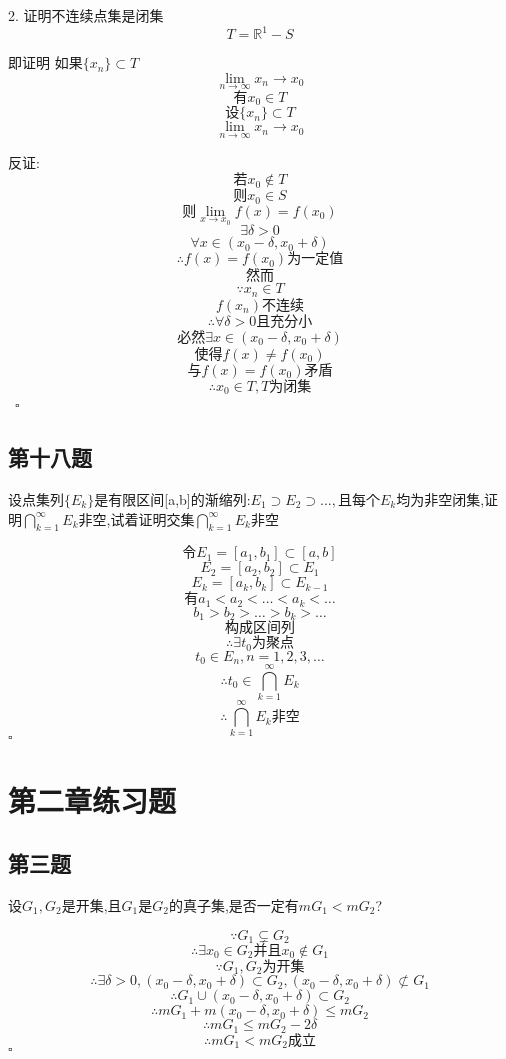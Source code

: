 \documentclass[a4paper]{article}
\begin{document}
    2. 证明不连续点集是闭集
    \[T=\mathbb{R}^1-S\]

    即证明 如果$\{x_n\}\subset T$
    \[\lim_{n \to \infty}x_n \to x_0\]
    \[\text{有}x_0\in T\]
    \[\text{设}\{x_n\}\subset T\]
    \[\lim_{n \to \infty}x_n \to x_0\]

    反证:
    \[\text{若}x_0\not\in T\]
    \[\text{则}x_0\in S\]
    \[\text{则}\lim_{x\to x_0}f(x)=f(x_0)\]
    \[\exists \delta > 0\]
    \[\forall x \in (x_0-\delta,x_0+\delta)\]
    \[\therefore f(x)=f(x_0)\text{为一定值}\]
    \[\text{然而}\]
    \[\because x_n \in T\]
    \[f(x_n)不连续\]
    \[\therefore \forall \delta >0\text{且充分小}\]
    \[\text{必然}\exists  x \in (x_0-\delta,x_0+\delta)\]
    \[\text{使得}f(x) \ne f(x_0)\]
    \[\text{与} f(x)=f(x_0) \text{矛盾}\]
    \[\therefore x_0 \in T , T \text{为闭集}\]\
    \hfill $\square$

    \subsection{第十八题}
    设点集列$\{E_k\}$是有限区间[a,b]的渐缩列:$E_1 \supset E_2 \supset \ldots,$且每个$E_k$均为非空闭集,证明$\bigcap_{k=1}^{\infty}E_k$非空,试着证明交集$ \bigcap_{k=1}^{\infty} E_k$非空

    \[\text{令}E_1=[a_1,b_1]\subset [a,b]\]
    \[E_2 =[a_2,b_2]\subset E_1\]
    \[E_k = [a_k,b_k]\subset E_{k-1}\]
    \[\text{有}a_1<a_2<\ldots<a_k<\ldots\]
    \[b_1>b_2>\ldots>b_k>\ldots\]
    \[\text{构成区间列}\]
    \[\therefore \exists t_0 \text{为聚点}\]
    \[t_0 \in E_n,n=1,2,3,\ldots\]
    \[\therefore t_0 \in \bigcap_{k=1}^{\infty}E_k\]
    \[\therefore \bigcap_{k=1}^{\infty}E_k\text{非空}\]
    \hfill $\square$

    \section{第二章练习题}
    \subsection{第三题}
    设$G_1,G_2$是开集,且$G_1$是$G_2$的真子集,是否一定有$mG_1<mG_2$?

        \[\because G_1 \subsetneq G_2\]
        \[\therefore \exists x_0 \in G_2 \text{并且}  x_0 \notin G_1\]
        \[\because G_1,G_2 \text{为开集}\]
        \[\therefore \exists \delta > 0,(x_0 - \delta,x_0 + \delta) \subset G_2,(x_0 - \delta,x_0 + \delta)\not\subset G_1\]
        \[\therefore G_1\cup(x_0 - \delta,x_0 + \delta) \subset G_2\]
        \[\therefore mG_1 + m(x_0 - \delta,x_0 + \delta) \leq mG_2\]
        \[\therefore mG_1 \leq mG_2 - 2\delta\]
        \[\therefore mG_1<mG_2 \text{成立}\]
    \hfill $\square$
\end{document}

